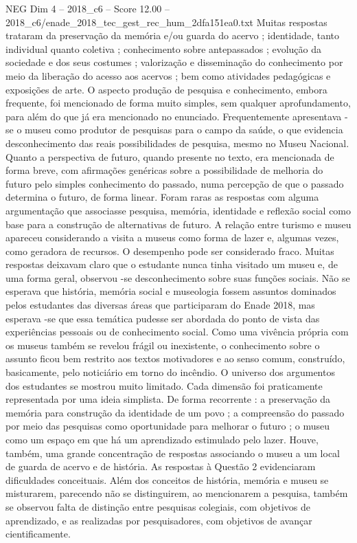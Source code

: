 \begin{textsample}{NEG Dim 4 – 2018\_c6 – Score 12.00 – 2018\_c6/enade\_2018\_tec\_gest\_rec\_hum\_2dfa151ea0.txt}
Muitas respostas trataram da preservação da memória e/ou guarda do acervo ; identidade, tanto individual quanto coletiva ; conhecimento sobre antepassados ; evolução da sociedade e dos seus costumes ; valorização e disseminação do conhecimento por meio da liberação do acesso aos acervos ; bem como atividades pedagógicas e exposições de arte.
O aspecto produção de pesquisa e conhecimento, embora frequente, foi mencionado de forma muito simples, sem qualquer aprofundamento, para além do que já era mencionado no enunciado.
Frequentemente apresentava -se o museu como produtor de pesquisas para o campo da saúde, o que evidencia desconhecimento das reais possibilidades de pesquisa, mesmo no Museu Nacional.
Quanto a perspectiva de futuro, quando presente no texto, era mencionada de forma breve, com afirmações genéricas sobre a possibilidade de melhoria do futuro pelo simples conhecimento do passado, numa percepção de que o passado determina o futuro, de forma linear.
Foram raras as respostas com alguma argumentação que associasse pesquisa, memória, identidade e reflexão social como base para a construção de alternativas de futuro.
A relação entre turismo e museu apareceu considerando a visita a museus como forma de lazer e, algumas vezes, como geradora de recursos.
O desempenho pode ser considerado fraco.
Muitas respostas deixavam claro que o estudante nunca tinha visitado um museu e, de uma forma geral, observou -se desconhecimento sobre suas funções sociais.
Não se esperava que história, memória social e museologia fossem assuntos dominados pelos estudantes das diversas áreas que participaram do Enade 2018, mas esperava -se que essa temática pudesse ser abordada do ponto de vista das experiências pessoais ou de conhecimento social.
Como uma vivência própria com os museus também se revelou frágil ou inexistente, o conhecimento sobre o assunto ficou bem restrito aos textos motivadores e ao senso comum, construído, basicamente, pelo noticiário em torno do incêndio.
O universo dos argumentos dos estudantes se mostrou muito limitado.
Cada dimensão foi praticamente representada por uma ideia simplista.
De forma recorrente : a preservação da memória para construção da identidade de um povo ; a compreensão do passado por meio das pesquisas como oportunidade para melhorar o futuro ; o museu como um espaço em que há um aprendizado estimulado pelo lazer.
Houve, também, uma grande concentração de respostas associando o museu a um local de guarda de acervo e de história.
As respostas à Questão 2 evidenciaram dificuldades conceituais.
Além dos conceitos de história, memória e museu se misturarem, parecendo não se distinguirem, ao mencionarem a pesquisa, também se observou falta de distinção entre pesquisas colegiais, com objetivos de aprendizado, e as realizadas por pesquisadores, com objetivos de avançar cientificamente.

\end{textsample}
